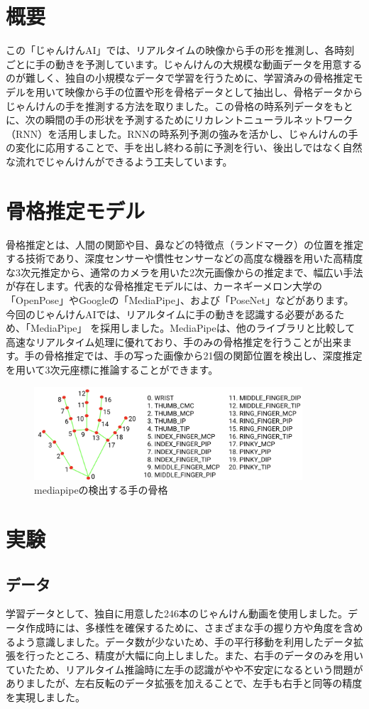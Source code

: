 \section{概要}
この「じゃんけんAI」では、リアルタイムの映像から手の形を推測し、各時刻ごとに手の動きを予測しています。じゃんけんの大規模な動画データを用意するのが難しく、独自の小規模なデータで学習を行うために、学習済みの骨格推定モデルを用いて映像から手の位置や形を骨格データとして抽出し、骨格データからじゃんけんの手を推測する方法を取りました。この骨格の時系列データをもとに、次の瞬間の手の形状を予測するためにリカレントニューラルネットワーク（RNN）を活用しました。RNNの時系列予測の強みを活かし、じゃんけんの手の変化に応用することで、手を出し終わる前に予測を行い、後出しではなく自然な流れでじゃんけんができるよう工夫しています。

\section{骨格推定モデル}
骨格推定とは、人間の関節や目、鼻などの特徴点（ランドマーク）の位置を推定する技術であり、深度センサーや慣性センサーなどの高度な機器を用いた高精度な3次元推定から、通常のカメラを用いた2次元画像からの推定まで、幅広い手法が存在します。代表的な骨格推定モデルには、カーネギーメロン大学の「OpenPose」やGoogleの「MediaPipe」、および「PoseNet」などがあります。今回のじゃんけんAIでは、リアルタイムに手の動きを認識する必要があるため、「MediaPipe」 を採用しました。MediaPipeは、他のライブラリと比較して高速なリアルタイム処理に優れており、手のみの骨格推定を行うことが出来ます。手の骨格推定では、手の写った画像から21個の関節位置を検出し、深度推定を用いて3次元座標に推論することができます。
\begin{figure}[h]
  \centering
  \includegraphics[width=10cm]{no-lose-janken/fig/hand-landmarks.png}
  \caption{mediapipeの検出する手の骨格}
  \label{fig:hand_landmark}
\end{figure}

\section{実験}
\subsection{データ}
学習データとして、独自に用意した246本のじゃんけん動画を使用しました。データ作成時には、多様性を確保するために、さまざまな手の握り方や角度を含めるよう意識しました。データ数が少ないため、手の平行移動を利用したデータ拡張を行ったところ、精度が大幅に向上しました。また、右手のデータのみを用いていたため、リアルタイム推論時に左手の認識がやや不安定になるという問題がありましたが、左右反転のデータ拡張を加えることで、左手も右手と同等の精度を実現しました。

